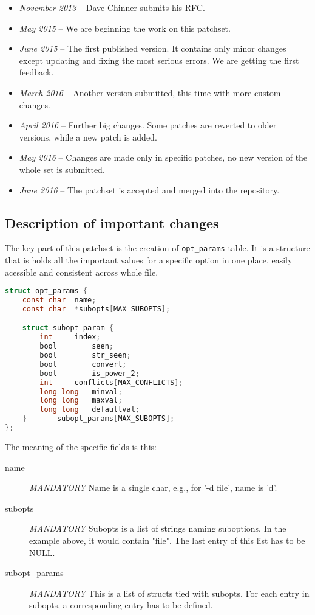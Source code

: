 \begin{itemize}
	\item {\em November 2013} -- Dave Chinner submits his RFC.
	\item {\em May 2015} -- We are beginning the work on this patchset.
	\item {\em June 2015} -- The first published version. It contains
		only minor changes except updating and fixing the most
		serious errors. We are getting the first feedback.
	\item {\em March 2016} -- Another version submitted, this time with
		more custom changes.
	\item {\em April 2016} -- Further big changes. Some patches are
		reverted to older versions, while a new patch is added.
	\item {\em May 2016} -- Changes are made only in specific patches,
		no new version of the whole set is submitted.
	\item {\em June 2016} -- The patchset is accepted and merged into
		the repository.
\end{itemize}

\subsection{Description of important changes}

The key part of this patchset is the creation of {\tt opt\_params} table.
It is a structure that is holds all the important values for a specific
option in one place, easily acessible and consistent across whole file.

\begin{lstlisting}[frame=none, basicstyle=\footnotesize\ttfamily,
language=C, numbers=none, numberstyle=\tiny\color{black},
caption= {Definition of the table.}]
struct opt_params {
	const char	name;
	const char	*subopts[MAX_SUBOPTS];

	struct subopt_param {
		int		index;
		bool		seen;
		bool		str_seen;
		bool		convert;
		bool		is_power_2;
		int		conflicts[MAX_CONFLICTS];
		long long	minval;
		long long	maxval;
		long long	defaultval;
	}		subopt_params[MAX_SUBOPTS];
};
\end{lstlisting}

The meaning of the specific fields is this:
\begin{description}
\item[name] {\em MANDATORY}
  Name is a single char, e.g., for '-d file', name is 'd'.

\item[subopts] {\em MANDATORY}
  Subopts is a list of strings naming suboptions. In the example above,
  it would contain "file". The last entry of this list has to be NULL.

\item[subopt\_params] {\em MANDATORY}
  This is a list of structs tied with subopts. For each entry in subopts,
  a corresponding entry has to be defined.
\end{description}


